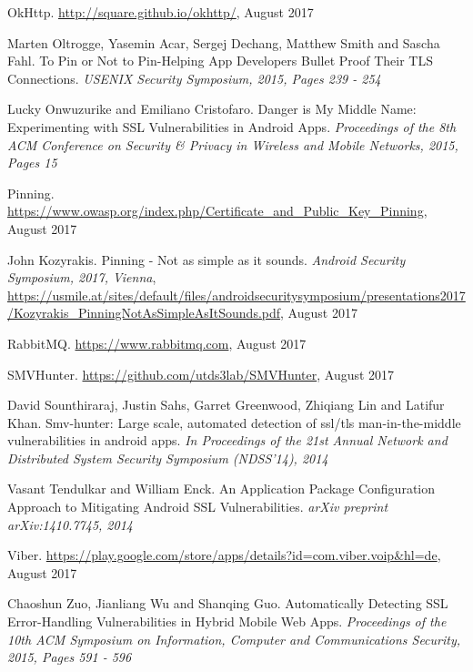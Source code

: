 \documentclass[draft,final]{vutinfth} %
\begin{document}
\begin{thebibliography}{99}
 OkHttp. \url{http://square.github.io/okhttp/}, August 2017

 Marten Oltrogge, Yasemin Acar, Sergej Dechang, Matthew Smith and Sascha Fahl. To Pin or Not to Pin-Helping App Developers Bullet Proof Their TLS Connections. \textit{USENIX Security Symposium, 2015, Pages 239 - 254}

Lucky Onwuzurike and Emiliano Cristofaro. Danger is My Middle Name: Experimenting with SSL Vulnerabilities in Android Apps. \textit{Proceedings of the 8th ACM Conference on Security \& Privacy in Wireless and Mobile Networks, 2015, Pages 15}

 Pinning.\\
\url{https://www.owasp.org/index.php/Certificate_and_Public_Key_Pinning}, August 2017

 John Kozyrakis. Pinning - Not as simple as it sounds. \textit{Android Security Symposium, 2017, Vienna}, \url{https://usmile.at/sites/default/files/androidsecuritysymposium/presentations2017/Kozyrakis_PinningNotAsSimpleAsItSounds.pdf}, August 2017

 RabbitMQ. \url{https://www.rabbitmq.com}, August 2017

 SMVHunter. \url{https://github.com/utds3lab/SMVHunter}, August 2017

 David Sounthiraraj, Justin Sahs, Garret Greenwood, Zhiqiang Lin and Latifur Khan. Smv-hunter: Large scale, automated detection of ssl/tls man-in-the-middle vulnerabilities in android apps. \textit{In Proceedings of the 21st Annual Network and Distributed System Security Symposium (NDSS’14), 2014}

Vasant Tendulkar and William Enck. An Application Package Configuration Approach to Mitigating Android SSL Vulnerabilities. \textit{arXiv preprint arXiv:1410.7745, 2014}

 Viber. \url{https://play.google.com/store/apps/details?id=com.viber.voip&hl=de}, August 2017

 Chaoshun Zuo, Jianliang Wu and Shanqing Guo. Automatically Detecting SSL Error-Handling Vulnerabilities in Hybrid Mobile Web Apps. \textit{Proceedings of the 10th ACM Symposium on Information, Computer and Communications Security, 2015, Pages 591 - 596}

\end{thebibliography}
\end{document}
